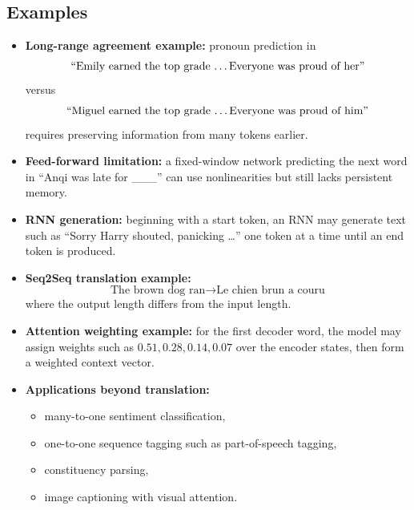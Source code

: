 \documentclass[11pt]{article}
\begin{document}
\subsection{Examples}
\begin{itemize}
    \item \textbf{Long-range agreement example:} pronoun prediction in
    \[
    \text{``Emily earned the top grade \dots Everyone was proud of her''}
    \]
    versus
    \[
    \text{``Miguel earned the top grade \dots Everyone was proud of him''}
    \]
    requires preserving information from many tokens earlier.
    \item \textbf{Feed-forward limitation:} a fixed-window network predicting the next word in ``Anqi was late for \_\_\_'' can use nonlinearities but still lacks persistent memory.
    \item \textbf{RNN generation:} beginning with a start token, an RNN may generate text such as ``Sorry Harry shouted, panicking \dots'' one token at a time until an end token is produced.
    \item \textbf{Seq2Seq translation example:}
    \[
    \text{The brown dog ran} \rightarrow \text{Le chien brun a couru}
    \]
    where the output length differs from the input length.
    \item \textbf{Attention weighting example:} for the first decoder word, the model may assign weights such as \(0.51, 0.28, 0.14, 0.07\) over the encoder states, then form a weighted context vector.
    \item \textbf{Applications beyond translation:}
    \begin{itemize}
        \item many-to-one sentiment classification,
        \item one-to-one sequence tagging such as part-of-speech tagging,
        \item constituency parsing,
        \item image captioning with visual attention.
    \end{itemize}
\end{itemize}
\end{document}
